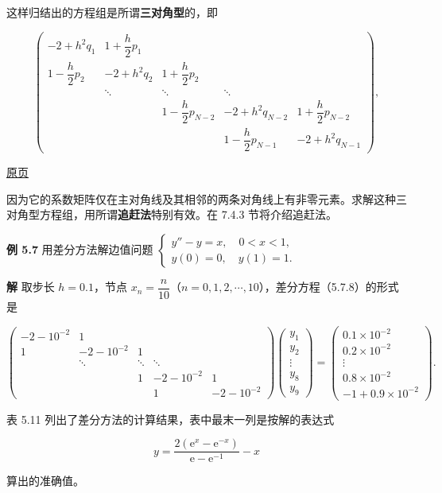 \documentclass[
  10pt,
  fontset=fandol]{ctexart}
\begin{document}
这样归结出的方程组是所谓\textbf{三对角型}的，即

\[
\begin{pmatrix}
-2+h^2q_1 & 1+\dfrac h2p_1 & & & \\
1-\dfrac h2p_2 & -2+h^2q_2 & 1+\dfrac h2p_2 & & \\
& \ddots & \ddots & \ddots & \\
& & 1-\dfrac h2p_{N-2} & -2+h^2q_{N-2} & 1+\dfrac h2p_{N-2} \\
& & & 1-\dfrac h2p_{N-1} & -2+h^2q_{N-1}
\end{pmatrix},
\]

\href{../../source-images/pdf-150.jpeg}{原页}

因为它的系数矩阵仅在主对角线及其相邻的两条对角线上有非零元素。求解这种三对角型方程组，用所谓\textbf{追赶法}特别有效。在 7.4.3 节将介绍追赶法。

\textbf{例 5.7} 用差分方法解边值问题 \(\begin{cases}y''-y=x,\quad0<x<1,\\y(0)=0,\quad y(1)=1.\end{cases}\)

\textbf{解} 取步长 \(h=0.1\)，节点 \(x_n=\dfrac n{10}\)（\(n=0,1,2,\cdots,10\)），差分方程（5.7.8）的形式是

\[
\begin{pmatrix}
-2-10^{-2}&1&&&\\
1&-2-10^{-2}&1&&\\
&\ddots&\ddots&\ddots&\\
&&1&-2-10^{-2}&1\\
&&&1&-2-10^{-2}
\end{pmatrix}
\begin{pmatrix}y_1\\y_2\\\vdots\\y_8\\y_9\end{pmatrix}
=
\begin{pmatrix}0.1\times10^{-2}\\0.2\times10^{-2}\\\vdots\\0.8\times10^{-2}\\-1+0.9\times10^{-2}\end{pmatrix}.
\]

表 5.11 列出了差分方法的计算结果，表中最末一列是按解的表达式

\[
y=\frac{2(\mathrm e^x-\mathrm e^{-x})}{\mathrm e-\mathrm e^{-1}}-x
\]

算出的准确值。
\end{document}
